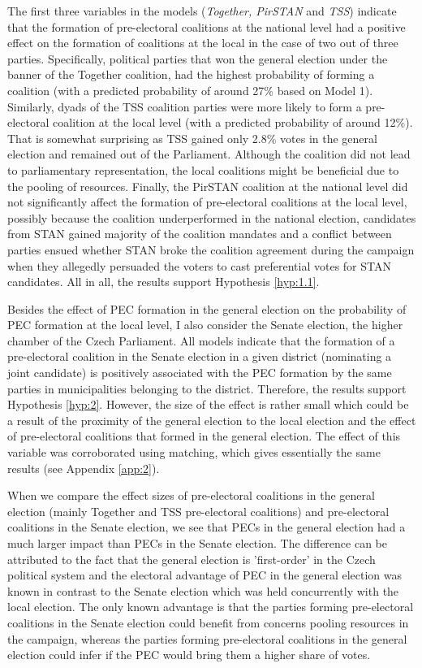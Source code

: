 \documentclass[fignum,12pt,titlepage]{article}
\begin{document}
The first three variables in the models (\emph{Together, PirSTAN} and \emph{TSS}) indicate that the formation of pre-electoral coalitions at the national level had a positive effect on the formation of coalitions at the local in the case of two out of three parties. Specifically, political parties that won the general election under the banner of the Together coalition, had the highest probability of forming a coalition (with a predicted probability of around 27\% based on Model 1). Similarly, dyads of the TSS coalition parties were more likely to form a pre-electoral coalition at the local level (with a predicted probability of around 12\%). That is somewhat surprising as TSS gained only 2.8\% votes in the general election and remained out of the Parliament. Although the coalition did not lead to parliamentary representation, the local coalitions might be beneficial due to the pooling of resources. Finally, the PirSTAN coalition at the national level did not significantly affect the formation of pre-electoral coalitions at the local level, possibly because the coalition underperformed in the national election, candidates from STAN gained majority of the coalition mandates and a conflict between parties ensued whether STAN broke the coalition agreement during the campaign when they allegedly persuaded the voters to cast preferential votes for STAN candidates. All in all, the results support Hypothesis \ref{hyp:1.1}.

Besides the effect of PEC formation in the general election on the probability of PEC formation at the local level, I also consider the Senate election, the higher chamber of the Czech Parliament. All models indicate that the formation of a pre-electoral coalition in the Senate election in a given district (nominating a joint candidate) is positively associated with the PEC formation by the same parties in municipalities belonging to the district. Therefore, the results support Hypothesis \ref{hyp:2}. However, the size of the effect is rather small which could be a result of the proximity of the general election to the local election and the effect of pre-electoral coalitions that formed in the general election.
The effect of this variable was corroborated using matching, which gives essentially the same results (see Appendix \ref{app:2}).

When we compare the effect sizes of pre-electoral coalitions in the general election (mainly Together and TSS pre-electoral coalitions) and pre-electoral coalitions in the Senate election, we see that PECs in the general election had a much larger impact than PECs in the Senate election. The difference can be attributed to the fact that the general election is 'first-order' in the Czech political system and the electoral advantage of PEC in the general election was known in contrast to the Senate election which was held concurrently with the local election. The only known advantage is that the parties forming pre-electoral coalitions in the Senate election could benefit from concerns pooling resources in the campaign, whereas the parties forming pre-electoral coalitions in the general election could infer if the PEC would bring them a higher share of votes.
\end{document}

